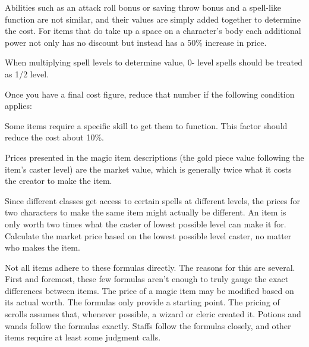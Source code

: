  Abilities such as an attack roll bonus or saving throw bonus and a spell-like function are not similar, and their values are simply added together to determine the cost. For items that do take up a space on a character's body each additional power not only has no discount but instead has a 50\% increase in price.

 When multiplying spell levels to determine value, 0- level spells should be treated as 1/2 level.

 Once you have a final cost figure, reduce that number if the following condition applies:
\begin{itemize}
 Some items require a specific skill to get them to function. This factor should reduce the cost about 10\%.
\end{itemize}

Prices presented in the magic item descriptions (the gold piece value following the item's caster level) are the market value, which is generally twice what it costs the creator to make the item.

Since different classes get access to certain spells at different levels, the prices for two characters to make the same item might actually be different. An item is only worth two times what the caster of lowest possible level can make it for. Calculate the market price based on the lowest possible level caster, no matter who makes the item.

Not all items adhere to these formulas directly. The reasons for this are several. First and foremost, these few formulas aren't enough to truly gauge the exact differences between items. The price of a magic item may be modified based on its actual worth. The formulas only provide a starting point. The pricing of scrolls assumes that, whenever possible, a wizard or cleric created it. Potions and wands follow the formulas exactly. Staffs follow the formulas closely, and other items require at least some judgment calls.

